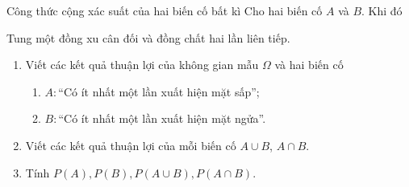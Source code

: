 \begin{dang}{Công thức cộng xác suất của hai biến cố bất kì}
	Cho hai biến cố $A$ và $B$. Khi đó 
\end{dang}
\begin{vd}%
	Tung một đồng xu cân đối và đồng chất hai lần liên tiếp.
	\begin{enumerate}
		\item Viết các kết quả thuận lợi của không gian mẫu $\Omega$ và hai biến cố
		\begin{enumerate}[]
			\item $A\colon$``Có ít nhất một lần xuất hiện mặt sấp'';
			\item $B\colon$``Có ít nhất một lần xuất hiện mặt ngửa''.
		\end{enumerate}
		\item Viết các kết quả thuận lợi của mỗi biến cố $A\cup B$, $A \cap B$.
		\item Tính $P(A), P(B),P(A\cup B), P(A\cap B)$.
	\end{enumerate}
\end{vd}

